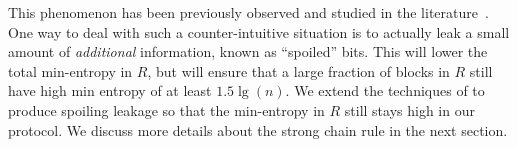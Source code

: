 This phenomenon has been previously observed and studied in the
literature~\cite{skorski2019strong}. One way to deal with such a counter-intuitive
situation is to actually leak a small amount of \emph{additional}
information, known as ``spoiled'' bits. This will lower the total
min-entropy in $R$, but will ensure that a large fraction of blocks in
$R$ still have high min entropy of at least $1.5\lg(n)$. We extend the
techniques of \cite{skorski2019strong} to produce spoiling leakage so that the min-entropy
in $R$ still stays high in our protocol. We discuss more details about the
strong chain rule in the next section. 
